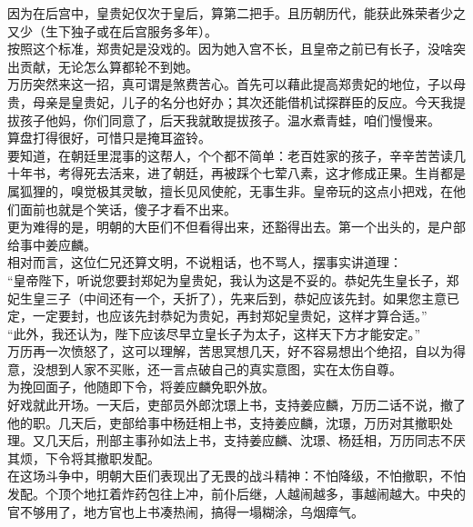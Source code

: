 \begin{multicols}{\theparacolNo}
因为在后宫中，皇贵妃仅次于皇后，算第二把手。且历朝历代，能获此殊荣者少之又少（生下独子或在后宫服务多年）。\\

按照这个标准，郑贵妃是没戏的。因为她入宫不长，且皇帝之前已有长子，没啥突出贡献，无论怎么算都轮不到她。\\

万历突然来这一招，真可谓是煞费苦心。首先可以藉此提高郑贵妃的地位，子以母贵，母亲是皇贵妃，儿子的名分也好办；其次还能借机试探群臣的反应。今天我提拔孩子他妈，你们同意了，后天我就敢提拔孩子。温水煮青蛙，咱们慢慢来。\\

算盘打得很好，可惜只是掩耳盗铃。\\

要知道，在朝廷里混事的这帮人，个个都不简单：老百姓家的孩子，辛辛苦苦读几十年书，考得死去活来，进了朝廷，再被踩个七荤八素，这才修成正果。生肖都是属狐狸的，嗅觉极其灵敏，擅长见风使舵，无事生非。皇帝玩的这点小把戏，在他们面前也就是个笑话，傻子才看不出来。\\

更为难得的是，明朝的大臣们不但看得出来，还豁得出去。第一个出头的，是户部给事中姜应麟。\\

相对而言，这位仁兄还算文明，不说粗话，也不骂人，摆事实讲道理：\\

“皇帝陛下，听说您要封郑妃为皇贵妃，我认为这是不妥的。恭妃先生皇长子，郑妃生皇三子（中间还有一个，夭折了），先来后到，恭妃应该先封。如果您主意已定，一定要封，也应该先封恭妃为贵妃，再封郑妃皇贵妃，这样才算合适。”\\

“此外，我还认为，陛下应该尽早立皇长子为太子，这样天下方才能安定。”\\

万历再一次愤怒了，这可以理解，苦思冥想几天，好不容易想出个绝招，自以为得意，没想到人家不买账，还一言点破自己的真实意图，实在太伤自尊。\\

为挽回面子，他随即下令，将姜应麟免职外放。\\

好戏就此开场。一天后，吏部员外郎沈璟上书，支持姜应麟，万历二话不说，撤了他的职。几天后，吏部给事中杨廷相上书，支持姜应麟，沈璟，万历对其撤职处理。又几天后，刑部主事孙如法上书，支持姜应麟、沈璟、杨廷相，万历同志不厌其烦，下令将其撤职发配。\\

在这场斗争中，明朝大臣们表现出了无畏的战斗精神：不怕降级，不怕撤职，不怕发配。个顶个地扛着炸药包往上冲，前仆后继，人越闹越多，事越闹越大。中央的官不够用了，地方官也上书凑热闹，搞得一塌糊涂，乌烟瘴气。\\


\end{multicols}
